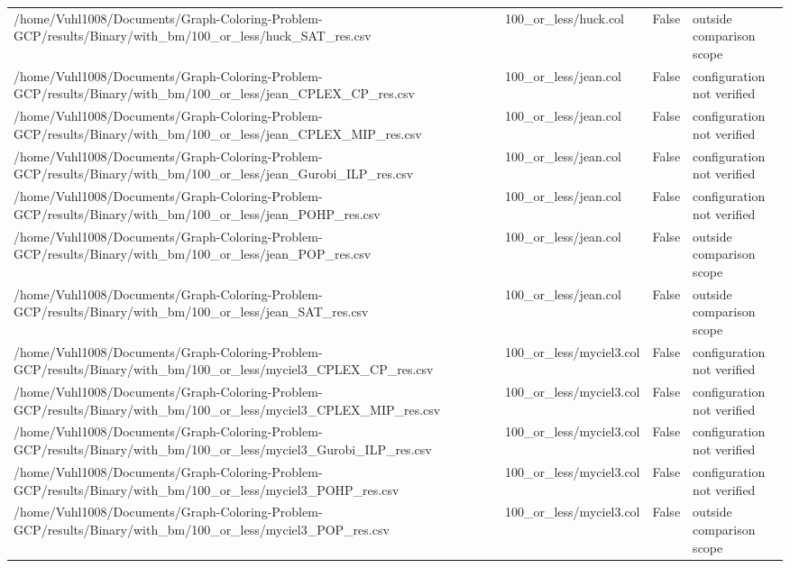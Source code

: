 \begin{table}[htbp]
\begin{tabular}{llll}
/home/Vuhl1008/Documents/Graph-Coloring-Problem-GCP/results/Binary/with\_bm/100\_or\_less/huck\_SAT\_res.csv & 100\_or\_less/huck.col & False & outside comparison scope \\
/home/Vuhl1008/Documents/Graph-Coloring-Problem-GCP/results/Binary/with\_bm/100\_or\_less/jean\_CPLEX\_CP\_res.csv & 100\_or\_less/jean.col & False & configuration not verified \\
/home/Vuhl1008/Documents/Graph-Coloring-Problem-GCP/results/Binary/with\_bm/100\_or\_less/jean\_CPLEX\_MIP\_res.csv & 100\_or\_less/jean.col & False & configuration not verified \\
/home/Vuhl1008/Documents/Graph-Coloring-Problem-GCP/results/Binary/with\_bm/100\_or\_less/jean\_Gurobi\_ILP\_res.csv & 100\_or\_less/jean.col & False & configuration not verified \\
/home/Vuhl1008/Documents/Graph-Coloring-Problem-GCP/results/Binary/with\_bm/100\_or\_less/jean\_POHP\_res.csv & 100\_or\_less/jean.col & False & configuration not verified \\
/home/Vuhl1008/Documents/Graph-Coloring-Problem-GCP/results/Binary/with\_bm/100\_or\_less/jean\_POP\_res.csv & 100\_or\_less/jean.col & False & outside comparison scope \\
/home/Vuhl1008/Documents/Graph-Coloring-Problem-GCP/results/Binary/with\_bm/100\_or\_less/jean\_SAT\_res.csv & 100\_or\_less/jean.col & False & outside comparison scope \\
/home/Vuhl1008/Documents/Graph-Coloring-Problem-GCP/results/Binary/with\_bm/100\_or\_less/myciel3\_CPLEX\_CP\_res.csv & 100\_or\_less/myciel3.col & False & configuration not verified \\
/home/Vuhl1008/Documents/Graph-Coloring-Problem-GCP/results/Binary/with\_bm/100\_or\_less/myciel3\_CPLEX\_MIP\_res.csv & 100\_or\_less/myciel3.col & False & configuration not verified \\
/home/Vuhl1008/Documents/Graph-Coloring-Problem-GCP/results/Binary/with\_bm/100\_or\_less/myciel3\_Gurobi\_ILP\_res.csv & 100\_or\_less/myciel3.col & False & configuration not verified \\
/home/Vuhl1008/Documents/Graph-Coloring-Problem-GCP/results/Binary/with\_bm/100\_or\_less/myciel3\_POHP\_res.csv & 100\_or\_less/myciel3.col & False & configuration not verified \\
/home/Vuhl1008/Documents/Graph-Coloring-Problem-GCP/results/Binary/with\_bm/100\_or\_less/myciel3\_POP\_res.csv & 100\_or\_less/myciel3.col & False & outside comparison scope \\

\end{tabular}
\end{table}
